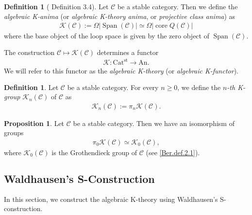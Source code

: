 \documentclass[a4paper,dvipdfmx,11pt,reqno]{amsart}
\newcommand{\C}{\mathcal{C}}
\newcommand{\K}{\mathcal{K}}
\DeclareMathOperator{\core}{core}
\DeclareMathOperator{\Span}{Span}
\newcommand{\An}{\mathrm{An}}
\newcommand{\Catst}{\mathrm{Cat^{st}}}
\theoremstyle{definition}
\newtheorem{definition}[theorem]{Definition}
\newtheorem{proposition}[theorem]{Proposition}
\begin{document}
\begin{definition}[\cite{HLS23} Definition 3.4] \label{HLS23.def.3.4}
  Let $\C$ be a stable category.
  Then we define the \textit{algebraic K-anima} (or \textit{algebraic K-theory anima}, or \textit{projective class anima}) as 
  \begin{align*}
    \K(\C) := \Omega|\Span(\C)| \simeq \Omega|\core Q(\C)|
  \end{align*}
  where the base object of the loop space is given by the zero object of $\Span(\C)$.

  The construction $\C \mapsto \K(\C)$ determines a functor 
  \begin{align*}
    \K : \Catst \to \An. 
  \end{align*}
  We will refer to this functor as the \textit{algebraic K-theory} (or \textit{algebraic K-functor}).
\end{definition}

\begin{definition}
  Let $\C$ be a stable category.
  For every $n \geq 0$, we define the \textit{$n$-th K-group} $\K_{n}(\C)$ of $\C$ as 
  \begin{align*}
    \K_n(\C) := \pi_n\K(\C).
  \end{align*}
\end{definition}

\begin{proposition}
  Let $\C$ be a stable category.
  Then we have an isomorphism of groups
  \begin{align*}
    \pi_0\K(\C) \simeq \K_0(\C),
  \end{align*}
  where $\K_0(\C)$ is the Grothendieck group of $\C$ (see \cref{Ber.def.2.1}).
\end{proposition}

\subsection{Waldhausen's S-Construction}

In this section, we construct the algebraic K-theory using Waldhausen's S-construction. 
\end{document}
